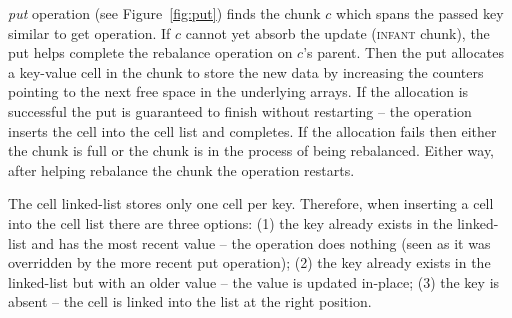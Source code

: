 {\kiwi} \emph{put} operation (see Figure~\ref{fig:put}) finds the chunk $c$ which spans the passed key similar to get operation. If $c$ cannot yet absorb the update (\textsc{infant} chunk), the put helps complete the rebalance operation on $c$'s parent.
Then the put allocates a key-value cell in the chunk to store the new data by increasing the counters pointing to the next free space in the underlying arrays.  
If the allocation is successful the put is guaranteed to finish without restarting -- the operation inserts the cell into the cell list and completes. If the allocation fails then either the chunk is full or the chunk is in the process of being rebalanced.  Either way, after helping rebalance the chunk the operation restarts.
 
The cell linked-list stores only one cell per key. Therefore, when inserting a cell into the cell list there are three options: (1) the key already exists in the linked-list and has the most recent value -- the operation does nothing (seen as it was overridden by the more recent put operation); (2) the key already exists in the linked-list but with an older value -- the value is updated in-place; (3) the key is absent -- the cell is linked into the list at the right position. 


